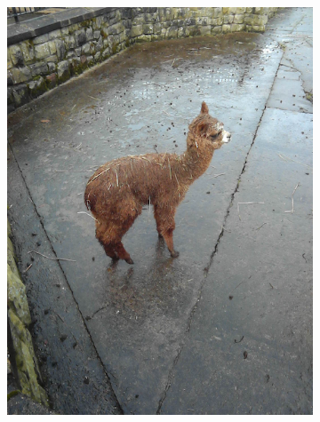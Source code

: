 \documentclass{l4proj}
\begin{document}
\begin{figure}[ht]
\begin{subfigure}[h!]{0.18\textwidth}
    \includegraphics[width=\textwidth, trim={0cm 2.5cm 0cm 2.5cm}, clip]{images/dataset/alpaca/rgb.png}

\end{subfigure}
\end{figure}
\end{document}
